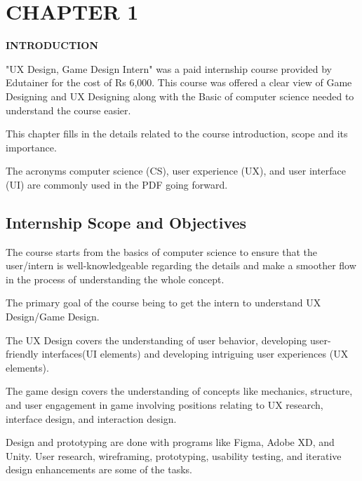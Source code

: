 \documentclass[12pt]{article}
\begin{document}

\section*{CHAPTER 1}

\setcounter{subsection}{0}
\renewcommand{\thesubsection}{1.\arabic{subsection}}

\begin{center}
\textbf{\Large INTRODUCTION}
\end{center}

"UX Design, Game Design Intern" was a paid internship course provided by Edutainer for the cost of Rs 6,000. This course was offered a clear view of Game Designing and UX Designing along with the Basic of computer science needed to understand the course easier.

This chapter fills in the details related to the course introduction, scope and its importance.

The acronyms computer science (CS), user experience (UX), and user interface (UI) are commonly used in the PDF going forward.

\subsection{Internship Scope and Objectives}

The course starts from the basics of computer science to ensure that the user/intern is well-knowledgeable regarding the details and make a smoother flow in the process of understanding the whole concept. 

The primary goal of the course being to get the intern to understand UX Design/Game Design. 

The UX Design covers the understanding of user behavior, developing user-friendly interfaces(UI elements) and developing intriguing user experiences (UX elements). 

The game design covers the understanding of concepts like mechanics, structure, and user engagement in game involving positions relating to UX research, interface design, and interaction design.

Design and prototyping are done with programs like Figma, Adobe XD, and Unity. User research, wireframing, prototyping, usability testing, and iterative design enhancements are some of the tasks.
\end{document}
